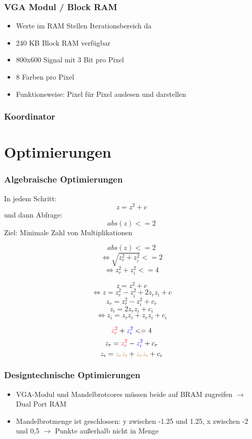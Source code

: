 \documentclass{beamer}
\begin{document}
\begin{frame}
    \frametitle{VGA Modul / Block RAM}
    \begin{itemize}
        \item Werte im RAM Stellen Iterationsbereich da
        \item 240 KB Block RAM verfügbar
        \item 800x600 Signal mit 3 Bit pro Pixel
        \item 8 Farben pro Pixel
        \item Funktionsweise: Pixel für Pixel auslesen und darstellen
    \end{itemize}
\end{frame}

\begin{frame}
    \frametitle{Koordinator}
\end{frame}

\section{Optimierungen}
\begin{frame}
    \frametitle{Algebraische Optimierungen}
    In jedem Schritt:
    \[z = z^2 + c\]
    und dann Abfrage:
    \[abs(z) <= 2\]
    \color{red}Ziel: \color{black} Minimale Zahl von Multiplikationen
\end{frame}

\begin{frame}
    \[abs(z) <= 2\]
    \[\Leftrightarrow\sqrt{z_r^2 + z_i^2} <= 2\]
    \[\Leftrightarrow z_r^2 + z_i^2 <= 4\]
\end{frame}

\begin{frame}
    \[z = z^2 + c\]
    \[\Leftrightarrow z = z_r^2 - z_i^2 + 2 z_r z_i + c\]
    \[z_r = z_r^2 - z_i^2 + c_r\]
    \[z_i = 2  z_r  z_i + c_i\]
    \[\Leftrightarrow z_i = z_r z_i + z_r z_i + c_i\]
\end{frame}

\begin{frame}
    \[\color{red} z_r^2 \color{black} + \color{blue} z_i^2 \color{black} <= 4\]
    \[z_r = \color{red} z_r^2 \color{black} - \color{blue} z_i^2 \color{black} + c_r\]
    \[z_i = \color{brown} z_r z_i \color{black} + \color{brown} z_r z_i \color{black} + c_i\]
\end{frame}

\begin{frame}
    \frametitle{Designtechnische Optimierungen}
    \begin{itemize}
        \item VGA-Modul und Mandelbrotcores müssen beide auf BRAM zugreifen $\rightarrow$ Dual Port RAM
        \item Mandelbrotmenge ist geschlossen: y zwischen -1.25 und 1.25, x zwischen -2 und 0,5 $\rightarrow$ 
        Punkte außerhalb nicht in Menge
    \end{itemize}
\end{frame}
\end{document}
